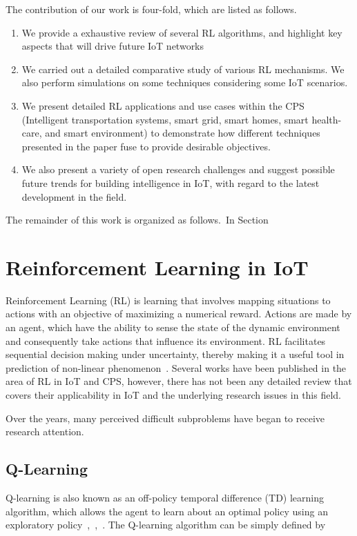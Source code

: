 \documentclass[journal]{IEEEtran}
\begin{document}
The contribution of our work is four-fold, which are listed as follows.
\indent
    \begin{enumerate}[leftmargin=*,label= \arabic*)]
      \item We provide a exhaustive review of several RL algorithms, and highlight key aspects that will drive future IoT networks

      \item We carried out a detailed comparative study of various RL mechanisms. We also perform simulations on some techniques considering some IoT scenarios.

      \item We present detailed RL applications and use cases within the CPS (Intelligent transportation systems, smart grid, smart homes, smart health-care, and smart environment) to demonstrate how different techniques presented in the paper fuse to provide desirable objectives.

      \item  We also present a variety of open research challenges and suggest possible future trends for building intelligence in IoT,
      with regard to the latest development in the field.
    \end{enumerate}


The remainder of this work is organized as follows.~In Section

\section{Reinforcement Learning in IoT}\label{sec:RLIoT}
Reinforcement Learning (RL) is learning that involves mapping situations to actions with an objective of maximizing a numerical reward. Actions are made by an agent, which have the ability to sense the state of the dynamic environment and consequently take actions that influence its environment. RL facilitates sequential decision making under uncertainty, thereby making it a useful tool in prediction of non-linear phenomenon~\cite{Zhang18}. Several works have been published in the area of RL in IoT and CPS, however, there has not been any detailed review that covers their applicability in IoT and the underlying research issues in this field.

Over the years, many perceived difficult subproblems have began to receive research attention.


\subsection{Q-Learning}
Q-learning is also known as an off-policy temporal difference (TD) learning algorithm, which allows the agent to learn about an optimal policy using an exploratory policy~\cite{Watkins92},~\cite{Wen15},~\cite{Sutton98}. The Q-learning algorithm can be simply defined by
\end{document}
